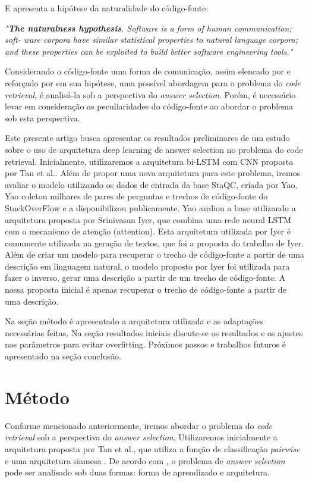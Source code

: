 \documentclass[12pt]{article}
\begin{document}
E \cite{Allamanis:2018:SML} apresenta a hipótese da naturalidade do código-fonte:

\textit{"\textbf{The naturalness hypothesis}. Software is a form of human communication; soft-
ware corpora have similar statistical properties to natural language corpora; and these
properties can be exploited to build better software engineering tools."}

Considerando o código-fonte uma forma de comunicação, assim elencado por \cite{Knuth:1984:LP} e reforçado por \cite{Allamanis:2018:SML} em sua hipótese, uma possível abordagem para o problema 
do \textit{code retrieval}, é analisá-la sob a perspectiva do \textit{answer selection}. Porém, é necessário levar em consideração as peculiaridades do código-fonte ao abordar o problema sob esta perspectiva. 

Este presente artigo busca apresentar os resultados preliminares de um estudo sobre o uso de arquitetura deep learning de answer selection no problema do code retrieval.
Inicialmente, utilizaremos a arquitetura bi-LSTM com CNN proposta por Tan et al.. Além de propor uma nova arquitetura para este problema, iremos avaliar o modelo 
utilizando os dados de entrada da base StaQC, criada por Yao. Yao coletou milhares de pares de perguntas e trechos de código-fonte do StackOverFlow e a 
disponibilizou publicamente. Yao avaliou a base utilizando a arquitetura proposta por Srinivasan Iyer, que combina uma rede neural LSTM com o mecanismo 
de atenção (attention). Esta arquitetura utilizada por Iyer é comumente utilizada na geração de textos, que foi a proposta do trabalho de Iyer. Além de criar um modelo
para recuperar o trecho de código-fonte a partir de uma descrição em linguagem natural, o modelo proposto por Iyer foi utilizada para fazer o inverso, gerar uma descrição
a partir de um trecho de código-fonte. A nossa proposta inicial é apenas recuperar o trecho de código-fonte a partir de uma descrição.

Na seção método é apresentado a arquitetura utilizada e as adaptações necessárias feitas. Na seção resultados iniciais discute-se os resultados e os ajustes nos 
parâmetros para evitar overfitting. Próximos passos e trabalhos futuros é apresentado na seção conclusão.


\section{Método} \label{sec:metodo}

Conforme mencionado anteriormente, iremos abordar o problema do \textit{code retrieval} sob a perspectiva do \textit{answer selection}. Utilizaremos inicialmente
a arquitetura proposta por Tan et al., que utiliza a função de classificação \textit{pairwise} e uma arquitetura siamesa \cite{lai-etal-2018-review}. De acordo com 
\cite{lai-etal-2018-review}, o problema de \textit{answer selection} pode ser analisado sob duas formas: forma de aprendizado e arquitetura.
\end{document}
